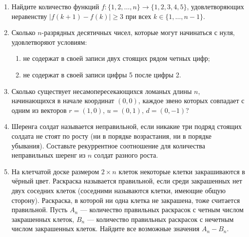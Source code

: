 \documentclass{article}
\begin{document}
\begin{enumerate}[label*=\protect\fbox{\arabic{enumi}}]
\item Найдите количество функций $f : \{1, 2, \ldots , n\} \to \{1, 2, 3, 4, 5\}$, удовлетворяющих неравенству $|f(k + 1) - f(k)| \geq 3$ при всех $k \in \{1, \ldots , n - 1\}$.

\item Сколько $n$-разрядных десятичных чисел, которые могут начинаться с нуля, удовлетворяют условиям:
\begin{enumerate}
\item не содержат в своей записи двух стоящих рядом четных цифр;
\item не содержат в своей записи цифры 5 после цифры 2.
\end{enumerate}

\item Сколько существует несамопересекающихся ломаных длины $n$, начинающихся в начале координат $(0, 0)$, каждое звено которых совпадает с одним из векторов $r = (1,0)$, $u = (0,1)$, $d = (0,-1)$?

\item Шеренга солдат называется неправильной, если никакие три подряд стоящих солдата не стоят по росту (ни в порядке возрастания, ни в порядке убывания). Составьте рекуррентное соотношение для количества неправильных шеренг из $n$ солдат разного роста.

\item На клетчатой доске размером $2 \times n$ клеток некоторые клетки закрашиваются в чёрный цвет. Раскраска называется правильной, если среди закрашенных нет двух соседних клеток (соседними называются клетки, имеющие общую сторону). Раскраска, в которой ни одна клетка не закрашена, тоже считается правильной. Пусть $A_n$ — количество правильных раскрасок с четным числом закрашенных клеток, $B_n$ — количество правильных раскрасок с нечетным числом закрашенных клеток. Найдите все возможные значения $A_n - B_n$.

\end{enumerate}
\end{document}

